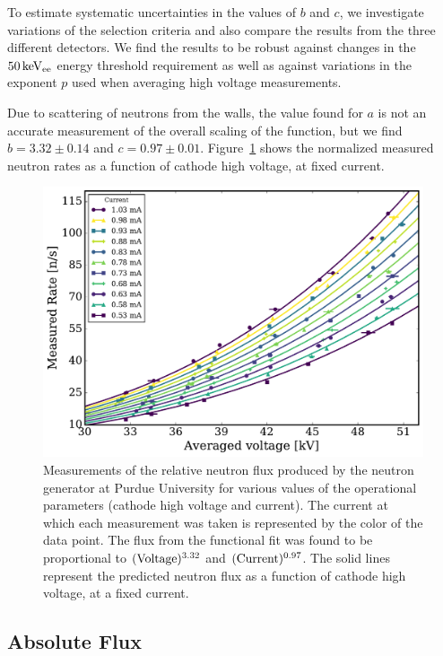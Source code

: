 To estimate systematic uncertainties in the values of $b$ and $c$, we investigate variations of the selection criteria and also compare the results from the three different detectors. We find the results to be robust against changes in the $50\,\mathrm{keV_{ee}}$ energy threshold requirement as well as against variations in the exponent $p$ used when averaging high voltage measurements.

Due to scattering of neutrons from the walls, the value found for $a$ is not an accurate measurement of the overall scaling of the function, but we find $b=3.32\pm0.14$ and $c=0.97\pm0.01$. Figure~\ref{fig:fluxandfit} shows the normalized measured neutron rates as a function of cathode high voltage, at fixed current.

\begin{figure}[!htbp]
\centering
    \includegraphics[width=\columnwidth]{figures/ng/fig_fluxandfit_v2_0}
    \caption{Measurements of the relative neutron flux produced by the neutron generator at Purdue University for various values of the operational parameters (cathode high voltage and current). The current at which each measurement was taken is represented by the color of the data point. The flux from the functional fit was found to be proportional to $(\mathrm{Voltage})^{3.32}$ and $(\mathrm{Current})^{0.97}$. The solid lines represent the predicted neutron flux as a function of cathode high voltage, at a fixed current.}\label{fig:fluxandfit}
\end{figure}

\subsection{Absolute Flux}

